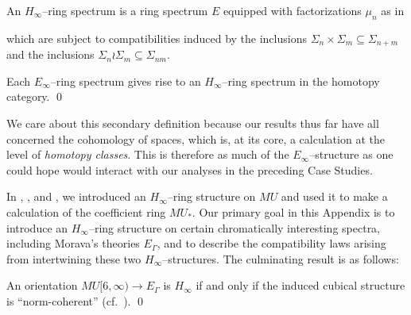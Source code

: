 \begin{definition}
An $H_\infty$--ring spectrum is a ring spectrum $E$ equipped with factorizations $\mu_n$ as in
\begin{center}
\end{center}
which are subject to compatibilities induced by the inclusions $\Sigma_n \times \Sigma_m \subseteq \Sigma_{n+m}$ and the inclusions $\Sigma_n \wr \Sigma_m \subseteq \Sigma_{nm}$.
\end{definition}

\begin{lemma}
Each $E_\infty$--ring spectrum gives rise to an $H_\infty$--ring spectrum in the homotopy category. \qed
\end{lemma}

\noindent We care about this secondary definition because our results thus far have all concerned the cohomology of spaces, which is, at its core, a calculation at the level of \emph{homotopy classes}.  This is therefore as much of the $E_\infty$--structure as one could hope would interact with our analyses in the preceding Case Studies.

In , , and , we introduced an $H_\infty$--ring structure on $MU$ and used it to make a calculation of the coefficient ring $MU_*$.  Our primary goal in this Appendix is to introduce an $H_\infty$--ring structure on certain chromatically interesting spectra, including Morava's theories $E_\Gamma$, and to describe the compatibility laws arising from intertwining these two $H_\infty$--structures.  The culminating result is as follows:

\begin{theorem}
An orientation $MU[6, \infty) \to E_\Gamma$ is $H_\infty$ if and only if the induced cubical structure is ``norm-coherent'' (cf.\ ). \qed
\end{theorem}

